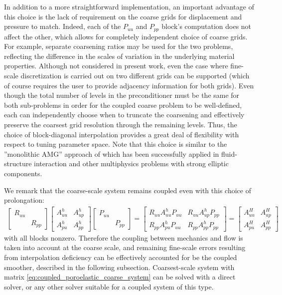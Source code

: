 In addition to a more straightforward implementation, an important advantage of this choice is the lack of requirement on the coarse grids for displacement and pressure to match.   Indeed, each of the $P_{uu}$ and $P_{pp}$ block's computation does not affect the other, which allows for completely independent choice of coarse grids.   For example, separate coarsening ratios may be used for the two problems, reflecting the difference in the scales of variation in the underlying material properties.   Although not considered in present work, even the case where fine-scale discretization is carried out on two different grids can be supported (which of course requires the user to provide adjacency information for both grids).   Even though the total number of levels in the preconditioner must be the same for both sub-problems in order for the coupled coarse problem to be well-defined, each can independently choose when to truncate the coarsening and effectively preserve the coarsest grid resolution through the remaining levels.   Thus, the choice of block-diagonal interpolation provides a great deal of flexibility with respect to tuning parameter space.   Note that this choice is similar to the ''monolithic AMG'' approach of \cite{Gee2011,Verdugo2016} which has been successfully applied in fluid-structure interaction and other multiphysics problems with strong elliptic components.

We remark that the coarse-scale system remains coupled even with this choice of prolongation:
\begin{align}
    \begin{bmatrix}
		R_{uu} &       \\
		       & R_{pp}
	\end{bmatrix}
	\begin{bmatrix}
		A_{uu}^h & A_{up}^h \\
		A_{pu}^h & A_{pp}^h
	\end{bmatrix}
	\begin{bmatrix}
	    P_{uu} &       \\
		       & P_{pp}
	\end{bmatrix} =
	\begin{bmatrix}
	    R_{uu} A_{uu}^h P_{uu} & R_{uu} A_{up}^h P_{pp} \\
	    R_{pp} A_{pu}^h P_{uu} & R_{pp} A_{pp}^h P_{pp}
	\end{bmatrix} =
	\begin{bmatrix}
		A_{uu}^H & A_{up}^H \\
		A_{pu}^H & A_{pp}^H
	\end{bmatrix}
	\label{eq:coupled_poroelastic_coarse_system}
\end{align}
with all blocks nonzero.   Therefore the coupling between mechanics and flow is taken into account at the coarse scale, and remaining fine-scale errors resulting from interpolation deficiency can be effectively accounted for be the coupled smoother, described in the following subsection.   Coarsest-scale system with matrix \cref{eq:coupled_poroelastic_coarse_system} can be solved with a direct solver, or any other solver suitable for a coupled system of this type.

